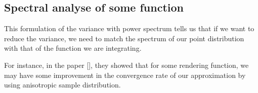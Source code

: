 \documentclass{classeENS}
\begin{document}
    
    
\subsection{Spectral analyse of some function}

\> This formulation of the variance with power spectrum tells us 
    that if we want to reduce the variance, we need to match the 
    spectrum of our point distribution with that of the function 
    we are integrating.

\> For instance, in the paper [\cite{singh17convergence}], they showed that for 
    some rendering function, we may have some improvement in the 
    convergence rate of our approximation by using anisotropic 
    sample distribution.
\end{document}
